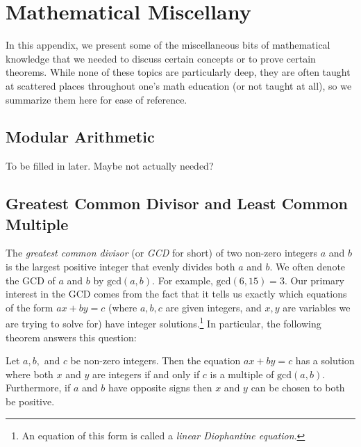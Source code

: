 \chapter{Mathematical Miscellany}\label{app:math}

In this appendix, we present some of the miscellaneous bits of mathematical knowledge that we needed to discuss certain concepts or to prove certain theorems. While none of these topics are particularly deep, they are often taught at scattered places throughout one's math education (or not taught at all), so we summarize them here for ease of reference.


\section{Modular Arithmetic}\label{sec:modular_arithmetic}

To be filled in later. Maybe not actually needed?


\section{Greatest Common Divisor and Least Common Multiple}\label{sec:gcd}

The \emph{greatest common divisor} (or \emph{GCD} for short) of two non-zero integers $a$ and $b$ is the largest positive integer that evenly divides both $a$ and $b$. We often denote the GCD of $a$ and $b$ by $\mathrm{gcd}(a,b)$. For example, $\mathrm{gcd}(6,15) = 3$. Our primary interest in the GCD comes from the fact that it tells us exactly which equations of the form $ax + by = c$ (where $a,b,c$ are given integers, and $x,y$ are variables we are trying to solve for) have integer solutions.\footnote{An equation of this form is called a \emph{linear Diophantine equation}.} In particular, the following theorem answers this question:

\begin{theorem}\label{thm:linear_diophantine}
	Let $a, b,$ and $c$ be non-zero integers. Then the equation $ax + by = c$ has a solution where both $x$ and $y$ are integers if and only if $c$ is a multiple of $\mathrm{gcd}(a,b)$. Furthermore, if $a$ and $b$ have opposite signs then $x$ and $y$ can be chosen to both be positive.
\end{theorem}

